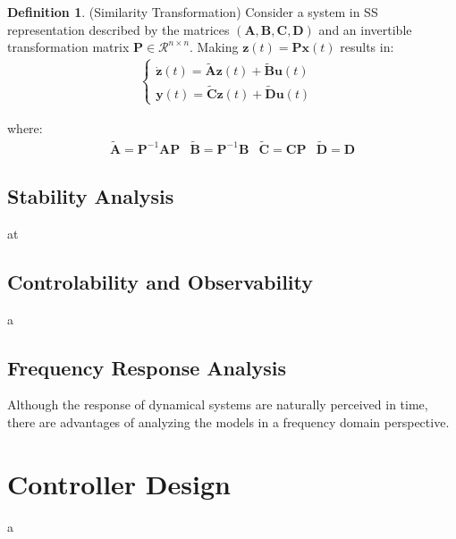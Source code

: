 \documentclass[a4paper,11pt]{book}
\numberwithin{figure}{chapter}
\numberwithin{equation}{chapter}
\numberwithin{table}{chapter}
\theoremstyle{definition}
\newtheorem{definition}{Definition}[chapter]
\begin{document}
\begin{definition}{(Similarity Transformation)}
	Consider a system in SS representation described by the matrices $(\bm{A}, \bm{B}, \bm{C}, \bm{D})$ and an invertible transformation matrix $\bm{P} \in \mathcal{R}^{n \times n}$. Making $\bm{z}(t) = \bm{P} \bm{x}(t)$ results in:
	\begin{align}
	\begin{cases}
		\dot{\bm{z}}(t) = \tilde{\bm{A}} \bm{z}(t) + \tilde{\bm{B}} \bm{u}(t) & \\
		\bm{y}(t) = \tilde{\bm{C}} \bm{z}(t) + \tilde{\bm{D}} \bm{u}(t)
	\end{cases}	
	\end{align}
	
	\noindent where:
	\begin{equation}
		\begin{matrix}
			\tilde{\bm{A}} = \bm{P}^{-1} \bm{A} \bm{P} & \tilde{\bm{B}} = \bm{P}^{-1} \bm{B} & \tilde{\bm{C}} = \bm{C} \bm{P} & \tilde{\bm{D}} = \bm{D}
		\end{matrix}
	\end{equation}
\end{definition}

\section{Stability Analysis}

at

\section{Controlability and Observability}

a

\section{Frequency Response Analysis}

Although the response of dynamical systems are naturally perceived in time, there are advantages of analyzing the models in a frequency domain perspective.

\clearpage
\chapter{Controller Design}

a
\end{document}
